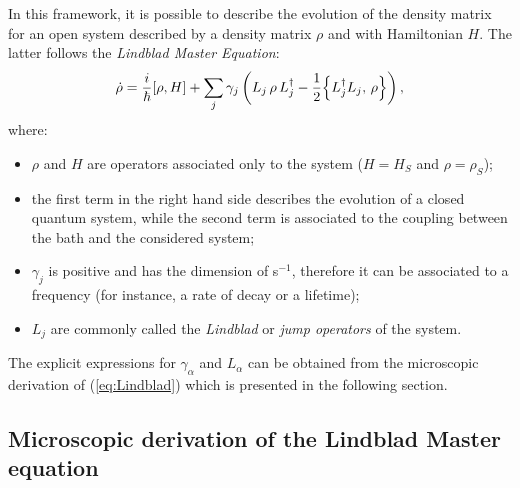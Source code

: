 In this framework, it is possible to describe the evolution of the density matrix for an open system described by a density matrix $\rho$ and with Hamiltonian $H$. The latter follows the \textit{Lindblad Master Equation}:
\begin{equation}
    \dot{\rho} = \frac{i}{\hbar} [\rho,H] + \sum_j \gamma_j \left( L_j \, \rho \,  L_j^\dagger - \frac{1}{2} \Bigl\{ L_j^\dagger L_j, \, \rho \Bigr\} \right),
    \label{eq:Lindblad}
\end{equation}
where:
\begin{itemize}
    \item $\rho$ and $H$ are operators associated only to the system ($H = H_S$ and $\rho = \rho_S$); 
    \item the first term in the right hand side describes the evolution of a closed quantum system, while the second term is associated to the coupling between the bath and the considered system;
    \item $\gamma_j$ is positive and has the dimension of s$^{-1}$, therefore it can be associated to a frequency (for instance, a rate of decay or a lifetime);
    \item $L_j$ are commonly called the \textit{Lindblad} or \textit{jump operators} of the system. 
\end{itemize}
The explicit expressions for $\gamma_\alpha$ and $L_\alpha$ can be obtained from the microscopic derivation of (\ref{eq:Lindblad}) which is presented in the following section. 

\subsection{Microscopic derivation of the Lindblad Master equation}

